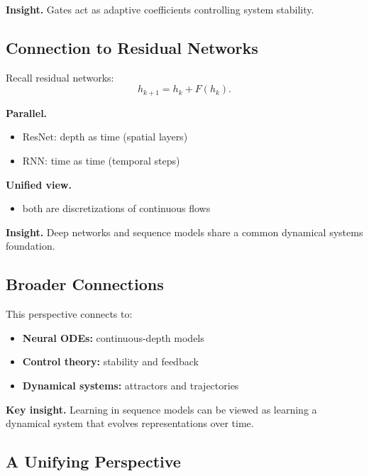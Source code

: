 \medskip

\noindent
\textbf{Insight.}  
Gates act as adaptive coefficients controlling system stability.

\subsection{Connection to Residual Networks}

Recall residual networks:
\[
h_{k+1} = h_k + F(h_k).
\]

\medskip

\noindent
\textbf{Parallel.}

\begin{itemize}
    \item ResNet: depth as time (spatial layers)
    \item RNN: time as time (temporal steps)
\end{itemize}

\medskip

\noindent
\textbf{Unified view.}

\begin{itemize}
    \item both are discretizations of continuous flows
\end{itemize}

\medskip

\noindent
\textbf{Insight.}  
Deep networks and sequence models share a common dynamical systems foundation.

\subsection{Broader Connections}

This perspective connects to:

\begin{itemize}
    \item \textbf{Neural ODEs:} continuous-depth models
    \item \textbf{Control theory:} stability and feedback
    \item \textbf{Dynamical systems:} attractors and trajectories
\end{itemize}

\medskip

\noindent
\textbf{Key insight.}  
Learning in sequence models can be viewed as learning a dynamical system that evolves representations over time.

\subsection{A Unifying Perspective}


